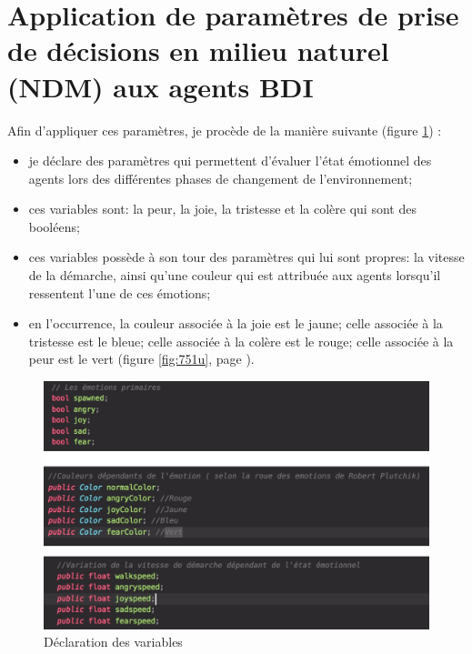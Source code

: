 \section{Application de paramètres de prise de décisions en milieu naturel (NDM) aux agents BDI}

Afin d’appliquer ces paramètres, je procède de la manière suivante (figure \ref{fig:75}) : 

\begin{itemize}
\item je déclare des paramètres qui permettent d’évaluer l’état émotionnel des agents lors des différentes phases de changement de l’environnement;
\item ces variables sont: la peur, la joie, la tristesse et la colère qui sont des booléens;
\item ces variables possède à son tour des paramètres qui lui sont propres: la vitesse de la démarche, ainsi qu'une couleur qui est attribuée aux agents lorsqu'il ressentent l'une de ces émotions;
\item en l'occurrence, la couleur associée à la joie est le jaune; celle associée à la tristesse est le bleue; celle associée à la colère est le rouge; celle associée à la peur est le vert (figure \ref{fig:751u}, page \pageref{fig:751u}).
\end{itemize} 

\begin{figure}[th]
\centering
\includegraphics{Figures/75unity.JPG}
\decoRule
\caption[Déclaration des variables]{Déclaration des variables}
\label{fig:75}
\end{figure}



